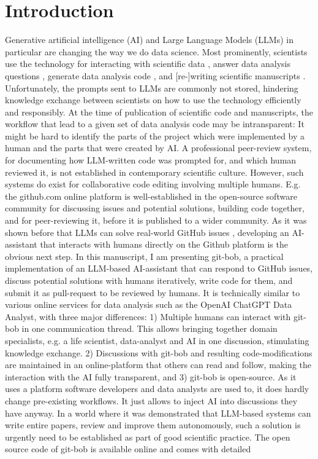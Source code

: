 \documentclass{ecai}
\begin{document}

\section{Introduction}

Generative artificial intelligence (AI) and Large Language Models (LLMs) in particular are changing the way we do data science. Most prominently, scientists use the technology for interacting with scientific data \citep{Royer2023}, answer data analysis questions \citep{Lai2022DS1000, lei2024bioimage}, generate data analysis code \citep{royer2023omega, benchmark_llm_bia, chen2021evaluating}, and [re-]writing scientific manuscripts \citep{lu2024aiscientist}. Unfortunately, the prompts sent to LLMs are commonly not stored, hindering knowledge exchange between scientists on how to use the technology efficiently and responsibly. At the time of publication of scientific code and manuscripts, the workflow that lead to a given set of data analysis code may be intransparent: It might be hard to identify the parts of the project which were implemented by a human and the parts that were created by AI. A professional peer-review system, for documenting how LLM-written code was prompted for, and which human reviewed it, is not established in contemporary scientific culture. However, such systems do exist for collaborative code editing involving multiple humans. E.g. the github.com online platform is well-established in the open-source software community for discussing issues and potential solutions, building code together, and for peer-reviewing it, before it is published to a wider community. As it was shown before that LLMs can solve real-world GitHub issues \citep{jimenez2024swebenchlanguagemodelsresolve}, developing an AI-assistant that interacts with humans directly on the Github platform is the obvious next step. In this manuscript, I am presenting git-bob, a practical implementation of an LLM-based AI-assistant that can respond to GitHub issues, discuss potential solutions with humans iteratively, write code for them, and submit it as pull-request to be reviewed by humans. It is technically similar to various online services for data analysis such as the OpenAI ChatGPT Data Analyst, with three major differences: 1) Multiple humans can interact with git-bob in one communication thread. This allows bringing together domain specialists, e.g. a life scientist, data-analyst and AI in one discussion, stimulating knowledge exchange. 2) Discussions with git-bob and resulting code-modifications are maintained in an online-platform that others can read and follow, making the interaction with the AI fully transparent, and 3) git-bob is open-source. As it uses a platform software developers and data analysts are used to, it does hardly change pre-existing workflows. It just allows to inject AI into discussions they have anyway. In a world where it was demonstrated that LLM-based systems can write entire papers, review and improve them \citep{lu2024aiscientist} autonomously, such a solution is urgently need to be established as part of good scientific practice. The open source code of git-bob is available online and comes with detailed 
\end{document}
